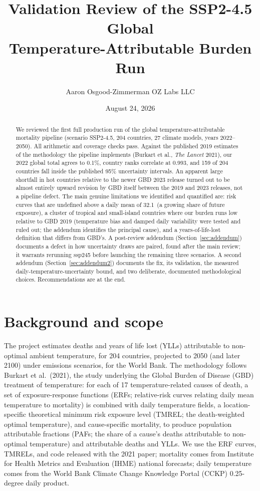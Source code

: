\documentclass[11pt]{ozreport}
\title{Validation Review of the SSP2-4.5 Global\\ Temperature-Attributable Burden Run}
\author{Aaron Osgood-Zimmerman \quad\textperiodcentered\quad OZ Labs LLC}
\date{August 24, 2026}
\begin{document}
\maketitle

\begin{abstract}
We reviewed the first full production run of the global temperature-attributable
mortality pipeline (scenario SSP2-4.5, 204 countries, 27 climate models, years
2022--2050). All arithmetic and coverage checks pass. Against the published
2019 estimates of the methodology the pipeline implements (Burkart et al.,
\textit{The Lancet} 2021), our 2022 global total agrees to 0.1\%, country
ranks correlate at 0.993, and 159 of 204 countries fall inside the published
95\% uncertainty intervals. An apparent large shortfall in hot countries
relative to the newer GBD 2023 release turned out to be almost entirely
upward revision by GBD itself between the 2019 and 2023 releases, not a pipeline defect. The main
genuine limitations we identified and quantified are: risk curves that are
undefined above a daily mean of 32.1\,\textcelsius{} (a growing share of
future exposure), a cluster of tropical and small-island countries where our
burden runs low relative to GBD 2019 (temperature bias and damped daily
variability were tested and ruled out; the addendum identifies the
principal cause), and a years-of-life-lost definition that differs from
GBD's.
A post-review addendum (Section~\ref{sec:addendum}) documents a defect in
how uncertainty draws are paired, found after the main review; it warrants
rerunning ssp245 before launching the remaining three scenarios. A second
addendum (Section~\ref{sec:addendum2}) documents the fix, its validation,
the measured daily-temperature-uncertainty bound, and two deliberate,
documented methodological choices.
Recommendations are at the end.
\end{abstract}

\section{Background and scope}

The project estimates deaths and years of life lost (YLLs) attributable to
non-optimal ambient temperature, for 204 countries, projected to 2050 (and
later 2100) under emissions scenarios, for the World Bank. The methodology
follows Burkart et al.\ (2021), the study underlying the Global Burden of
Disease (GBD) treatment of temperature: for each of 17 temperature-related
causes of death, a set of exposure-response functions (ERFs; relative-risk
curves relating daily mean temperature to mortality) is combined with daily
temperature fields, a location-specific theoretical minimum risk exposure
level (TMREL; the death-weighted optimal temperature), and cause-specific
mortality, to produce population attributable fractions (PAFs; the share of a
cause's deaths attributable to non-optimal temperature) and attributable
deaths and YLLs. We use the ERF curves, TMRELs, and code released with the
2021 paper; mortality comes from Institute for Health Metrics and Evaluation
(IHME) national forecasts; daily temperature comes from the World Bank
Climate Change Knowledge Portal (CCKP) 0.25-degree daily product.
\end{document}

